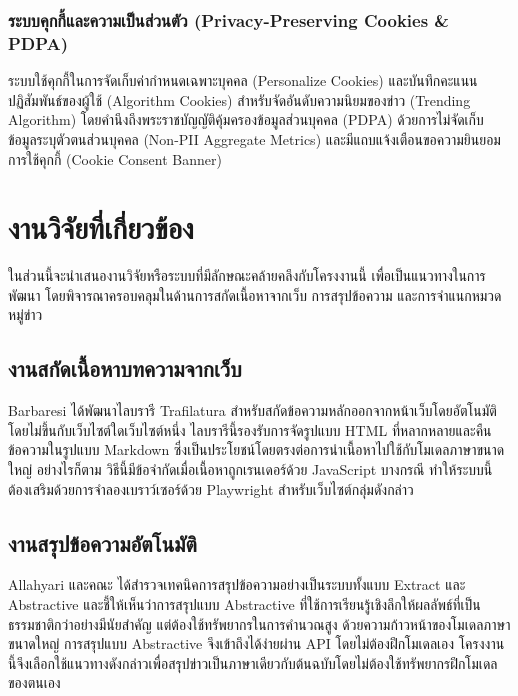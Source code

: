 \subsubsection{ระบบคุกกี้และความเป็นส่วนตัว (Privacy-Preserving Cookies \& PDPA)}
ระบบใช้คุกกี้ในการจัดเก็บค่ากำหนดเฉพาะบุคคล (Personalize Cookies) และบันทึกคะแนนปฏิสัมพันธ์ของผู้ใช้ (Algorithm Cookies) สำหรับจัดอันดับความนิยมของข่าว (Trending Algorithm) โดยคำนึงถึงพระราชบัญญัติคุ้มครองข้อมูลส่วนบุคคล (PDPA) ด้วยการไม่จัดเก็บข้อมูลระบุตัวตนส่วนบุคคล (Non-PII Aggregate Metrics) และมีแถบแจ้งเตือนขอความยินยอมการใช้คุกกี้ (Cookie Consent Banner)

\section{งานวิจัยที่เกี่ยวข้อง}

ในส่วนนี้จะนำเสนองานวิจัยหรือระบบที่มีลักษณะคล้ายคลึงกับโครงงานนี้ เพื่อเป็นแนวทางในการพัฒนา โดยพิจารณาครอบคลุมในด้านการสกัดเนื้อหาจากเว็บ การสรุปข้อความ และการจำแนกหมวดหมู่ข่าว

\subsection{งานสกัดเนื้อหาบทความจากเว็บ}

Barbaresi \cite{barbaresi-2021-trafilatura} ได้พัฒนาไลบรารี Trafilatura สำหรับสกัดข้อความหลักออกจากหน้าเว็บโดยอัตโนมัติ โดยไม่ขึ้นกับเว็บไซต์ใดเว็บไซต์หนึ่ง ไลบรารีนี้รองรับการจัดรูปแบบ HTML ที่หลากหลายและคืนข้อความในรูปแบบ Markdown ซึ่งเป็นประโยชน์โดยตรงต่อการนำเนื้อหาไปใช้กับโมเดลภาษาขนาดใหญ่ อย่างไรก็ตาม วิธีนี้มีข้อจำกัดเมื่อเนื้อหาถูกเรนเดอร์ด้วย JavaScript บางกรณี ทำให้ระบบนี้ต้องเสริมด้วยการจำลองเบราว์เซอร์ด้วย Playwright สำหรับเว็บไซต์กลุ่มดังกล่าว

\subsection{งานสรุปข้อความอัตโนมัติ}

Allahyari และคณะ \cite{allahyari2017} ได้สำรวจเทคนิคการสรุปข้อความอย่างเป็นระบบทั้งแบบ Extract และ Abstractive และชี้ให้เห็นว่าการสรุปแบบ Abstractive ที่ใช้การเรียนรู้เชิงลึกให้ผลลัพธ์ที่เป็นธรรมชาติกว่าอย่างมีนัยสำคัญ แต่ต้องใช้ทรัพยากรในการคำนวณสูง ด้วยความก้าวหน้าของโมเดลภาษาขนาดใหญ่ \cite{gemini2024} การสรุปแบบ Abstractive จึงเข้าถึงได้ง่ายผ่าน API โดยไม่ต้องฝึกโมเดลเอง โครงงานนี้จึงเลือกใช้แนวทางดังกล่าวเพื่อสรุปข่าวเป็นภาษาเดียวกับต้นฉบับโดยไม่ต้องใช้ทรัพยากรฝึกโมเดลของตนเอง

